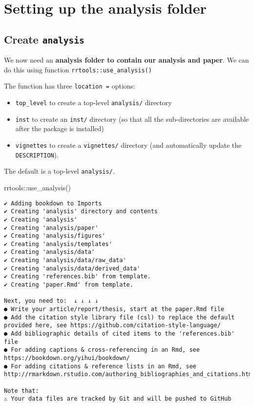 \documentclass[
  letterpaper,
  DIV=11,
  numbers=noendperiod]{scrreprt}
\newenvironment{Shaded}{\begin{snugshade}}{\end{snugshade}}
\newcommand{\FunctionTok}[1]{\textcolor[rgb]{0.28,0.35,0.67}{#1}}
\newcommand{\NormalTok}[1]{\textcolor[rgb]{0.00,0.23,0.31}{#1}}
\newcommand{\SpecialCharTok}[1]{\textcolor[rgb]{0.37,0.37,0.37}{#1}}
\begin{document}
\hypertarget{setting-up-the-analysis-folder}{%
\section{Setting up the analysis
folder}\label{setting-up-the-analysis-folder}}

\hypertarget{create-analysis}{%
\subsection{\texorpdfstring{Create
\texttt{analysis}}{Create analysis}}\label{create-analysis}}

We now need an \textbf{analysis folder to contain our analysis and
paper}. We can do this using function \texttt{rrtools::use\_analysis()}

The function has three \texttt{location\ =} options:

\begin{itemize}
\item
  \texttt{top\_level} to create a top-level \texttt{analysis/} directory
\item
  \texttt{inst} to create an \texttt{inst/} directory (so that all the
  sub-directories are available after the package is installed)
\item
  \texttt{vignettes} to create a \texttt{vignettes/} directory (and
  automatically update the \texttt{DESCRIPTION}).
\end{itemize}

The default is a top-level \texttt{analysis/}.

\begin{Shaded}
\begin{Highlighting}[]
\NormalTok{rrtools}\SpecialCharTok{::}\FunctionTok{use\_analysis}\NormalTok{()}
\end{Highlighting}
\end{Shaded}

\begin{verbatim}
✔ Adding bookdown to Imports
✔ Creating 'analysis' directory and contents
✔ Creating 'analysis'
✔ Creating 'analysis/paper'
✔ Creating 'analysis/figures'
✔ Creating 'analysis/templates'
✔ Creating 'analysis/data'
✔ Creating 'analysis/data/raw_data'
✔ Creating 'analysis/data/derived_data'
✔ Creating 'references.bib' from template.
✔ Creating 'paper.Rmd' from template.

Next, you need to:  ↓ ↓ ↓ ↓ 
● Write your article/report/thesis, start at the paper.Rmd file
● Add the citation style library file (csl) to replace the default provided here, see https://github.com/citation-style-language/
● Add bibliographic details of cited items to the 'references.bib' file
● For adding captions & cross-referencing in an Rmd, see https://bookdown.org/yihui/bookdown/
● For adding citations & reference lists in an Rmd, see http://rmarkdown.rstudio.com/authoring_bibliographies_and_citations.html

Note that:
⚠ Your data files are tracked by Git and will be pushed to GitHub
\end{verbatim}
\end{document}
